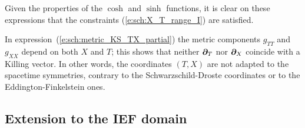 \begin{remark}
Given the properties of the $\cosh$ and $\sinh$ functions, it is clear on these
expressions that the constraints (\ref{e:sch:X_T_range_I}) are satisfied.
\end{remark}
\begin{remark}
In expression~(\ref{e:sch:metric_KS_TX_partial})
the metric components $g_{TT}$ and $g_{XX}$ depend on both $X$ and $T$; this
shows that neither $\bm{\partial}_T$ nor $\bm{\partial}_X$ coincide with a Killing vector.
In other words, the coordinates $(T,X)$ are not adapted to the spacetime
symmetries, contrary to the Schwarzschild-Droste coordinates or to the
Eddington-Finkelstein ones.
\end{remark}

\subsection{Extension to the IEF domain}

